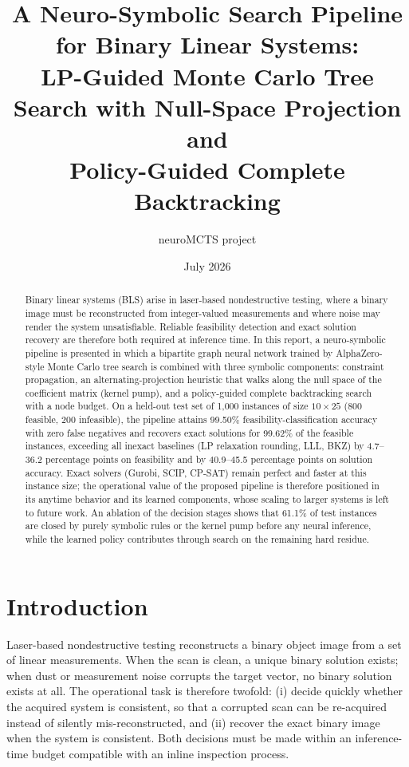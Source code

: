 \documentclass[12pt]{article}
\title{A Neuro-Symbolic Search Pipeline for Binary Linear Systems:\\
LP-Guided Monte Carlo Tree Search with Null-Space Projection and\\
Policy-Guided Complete Backtracking}
\author{neuroMCTS project}
\date{July 2026}
\begin{document}
\maketitle

\begin{abstract}
Binary linear systems (BLS) arise in laser-based nondestructive testing, where a binary image must be reconstructed from integer-valued measurements and where noise may render the system unsatisfiable. Reliable feasibility detection and exact solution recovery are therefore both required at inference time. In this report, a neuro-symbolic pipeline is presented in which a bipartite graph neural network trained by AlphaZero-style Monte Carlo tree search is combined with three symbolic components: constraint propagation, an alternating-projection heuristic that walks along the null space of the coefficient matrix (kernel pump), and a policy-guided complete backtracking search with a node budget. On a held-out test set of 1{,}000 instances of size $10 \times 25$ (800 feasible, 200 infeasible), the pipeline attains 99.50\% feasibility-classification accuracy with zero false negatives and recovers exact solutions for 99.62\% of the feasible instances, exceeding all inexact baselines (LP relaxation rounding, LLL, BKZ) by 4.7--36.2 percentage points on feasibility and by 40.9--45.5 percentage points on solution accuracy. Exact solvers (Gurobi, SCIP, CP-SAT) remain perfect and faster at this instance size; the operational value of the proposed pipeline is therefore positioned in its anytime behavior and its learned components, whose scaling to larger systems is left to future work. An ablation of the decision stages shows that 61.1\% of test instances are closed by purely symbolic rules or the kernel pump before any neural inference, while the learned policy contributes through search on the remaining hard residue.
\end{abstract}

\section{Introduction}

Laser-based nondestructive testing reconstructs a binary object image from a set of linear measurements. When the scan is clean, a unique binary solution exists; when dust or measurement noise corrupts the target vector, no binary solution exists at all. The operational task is therefore twofold: (i) decide quickly whether the acquired system is consistent, so that a corrupted scan can be re-acquired instead of silently mis-reconstructed, and (ii) recover the exact binary image when the system is consistent. Both decisions must be made within an inference-time budget compatible with an inline inspection process.
\end{document}
